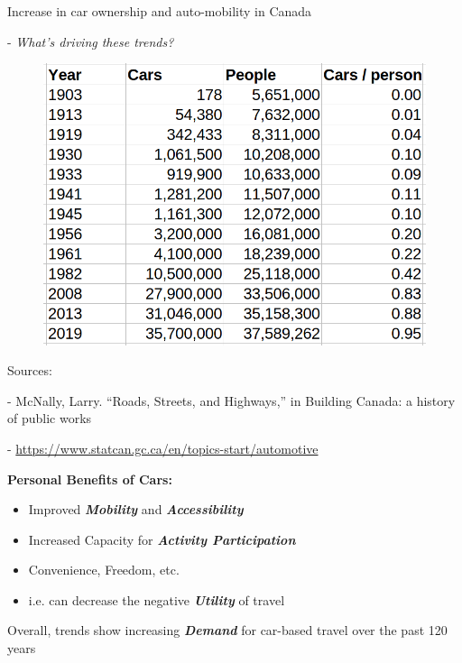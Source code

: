 \documentclass[aspectratio=169]{beamer}
\begin{document}
\begin{frame}
	
	
	Increase in car ownership and auto-mobility in Canada
	
	- \textit{What's driving these trends?}
	
	\begin{figure}
		\centering
		\includegraphics[width=0.6\linewidth]{images/cars_ppl_canada.png}
		
	\end{figure}
	
	\tiny{
		Sources:
		
		- McNally, Larry. “Roads, Streets, and Highways,” in Building Canada: a history of public	works
		
		- \url{https://www.statcan.gc.ca/en/topics-start/automotive}	
}
	
\end{frame}




\begin{frame}
	
	\textbf{Personal Benefits of Cars:}
	
	\vspace{3mm}
	
	\begin{itemize}
		\item Improved \textit{\textbf{Mobility}} and \textit{\textbf{Accessibility}}
		\item Increased Capacity for \textit{\textbf{Activity Participation}}
		\item Convenience, Freedom, etc.
		\item i.e. can decrease the negative \textbf{\textit{Utility}} of travel
	\end{itemize}
	
	Overall, trends show increasing \textbf{\textit{Demand}} for car-based travel over the past 120 years
	
\end{frame}
\end{document}

